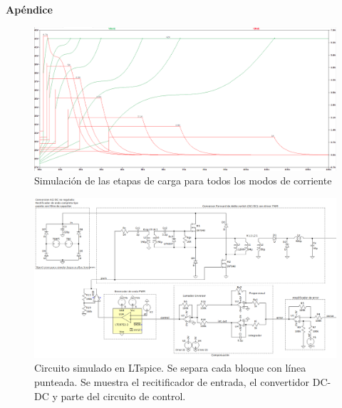 \newpage
{}
\appendix
\begin{landscape}
\begin{center}
    \bfseries\LARGE Apéndice \par
\end{center}

\begin{figure}[hbt]
    \centering
    \includegraphics[width=\linewidth]{images/carga_completa_step.png}
    \caption{Simulación de las etapas de carga para todos los modos de corriente}
    \label{fig:simulacion_carga}
\end{figure}
    
\begin{figure}[hbt]
    \centering
    \includegraphics[width=\linewidth]{images/sim-full-1.png}
    \caption{Circuito simulado en LTspice. Se separa cada bloque con línea punteada. Se muestra el recitificador de entrada, el convertidor DC-DC y parte del circuito de control.}
    \label{fig:sim-full-1}
\end{figure}


\end{landscape}
